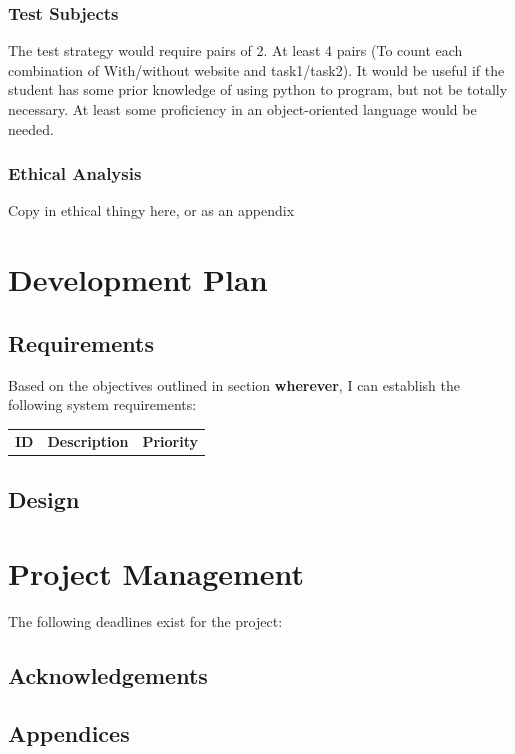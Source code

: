 \documentclass[a4paper,11pt]{report}
\begin{document}
\subsection{Test Subjects}
The test strategy would require pairs of 2. At least 4 pairs (To count each combination of With/without website and task1/task2). It would be useful if the student has some prior knowledge of using python to program, but not be totally necessary. At least some proficiency in an object-oriented language would be needed.

\subsection{Ethical Analysis}
Copy in ethical thingy here, or as an appendix

\chapter{Development Plan}

\section{Requirements}
Based on the objectives outlined in section \textbf{wherever}, I can establish the following system requirements:\par
\begin{longtable}{ccc}
\textbf{ID} & \textbf{Description} & \textbf{Priority}\\

\end{longtable}


\section{Design}


\chapter{Project Management}
The following deadlines exist for the project:

{}


\section*{Acknowledgements}

\section*{Appendices}
\end{document}
